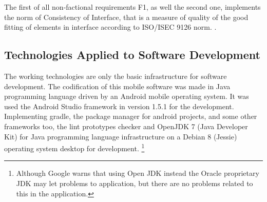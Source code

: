 	\begin{table}[h!]

		
		\begin{center}
			\end{center}
			\label{tab:NonFuncReq}
			\caption{Table for all non-functional requirements}
		\end{table}
The first of all non-factional requirements F1, as well the second one, implements the norm of Consistency of Interface, that is a measure of quality of the good fitting of elements in interface according to ISO/ISEC 9126 norm. \cite{ISO9126a}.

\subsection{Technologies Applied to Software Development}
		
The working technologies are only the basic infrastructure for software development. The codification of this mobile software was made in Java programming language driven by an Android mobile operating system. It was used the Android Studio framework in version 1.5.1 for the development. Implementing gradle, the package manager for android projects, and some other frameworks too, the lint prototypes checker and OpenJDK 7 (Java Developer Kit) for Java programming language infrastructure on a Debian 8 (Jessie) operating system desktop for development. \footnote{Although Google warns that using Open JDK instead the Oracle proprietary JDK may let problems to application, but there are no problems related to this in the application.} 
		
